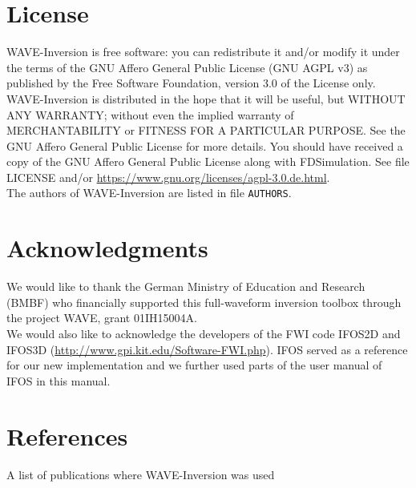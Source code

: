 \documentclass[pdftex,a4paper,parskip,listof=totoc,bibliography=totoc,onehalfspacing,12pt]{scrreprt}
\begin{document}
\tableofcontents %



\setcounter{page}{1}

\cleardoublepage
\chapter*{License}

WAVE-Inversion is free software: you can redistribute it and/or modify it under the terms of the GNU Affero General Public License (GNU AGPL v3) as published by the Free Software Foundation, version 3.0 of the License only.\\ 
WAVE-Inversion is distributed in the hope that it will be useful, but WITHOUT ANY WARRANTY; without even the implied warranty of MERCHANTABILITY or FITNESS FOR A PARTICULAR PURPOSE. See the GNU Affero General Public License for more details. You should have received a copy of the GNU Affero General Public License along with FDSimulation. See file LICENSE and/or \url{https://www.gnu.org/licenses/agpl-3.0.de.html}.\\
The authors of WAVE-Inversion are listed in file \lstinline{AUTHORS}.

\chapter*{Acknowledgments}

We would like to thank the German Ministry of Education and Research (BMBF) who financially supported this full-waveform inversion toolbox through the project WAVE, grant 01IH15004A.\\
We would also like to acknowledge the developers of the FWI code IFOS2D and IFOS3D (\url{http://www.gpi.kit.edu/Software-FWI.php}). IFOS served as a reference for our new implementation and we further used parts of the user manual of IFOS in this manual.

\chapter*{References}

A list of publications where WAVE-Inversion was used


\cleardoublepage
\end{document}

